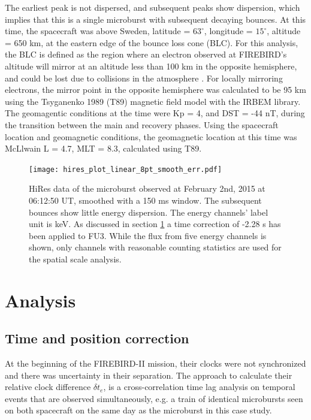 \documentclass[draft,linenumbers]{agujournal}
\begin{document}
The earliest peak is not dispersed, and subsequent peaks show dispersion, which implies that this is a single microburst with subsequent decaying bounces. At this time, the spacecraft was above Sweden, latitude = $63^{\circ}$, longitude = $15^{\circ}$, altitude = 650 km, at the eastern edge of the bounce loss cone (BLC). For this analysis, the BLC is defined as the region where an electron observed at FIREBIRD's altitude will mirror at an altitude less than 100 km in the opposite hemisphere, and could be lost due to collisions in the atmosphere \citep{Abel1998_1}. For locally mirroring electrons, the mirror point in the opposite hemisphere was calculated to be 95 km using the Tsyganenko 1989 (T89) magnetic field model \citep{Tsyganenko89} with the IRBEM library. The geomagentic conditions at the time were Kp = 4, and DST = -44 nT, during the transition between the main and recovery phases. Using the spacecraft location and geomagnetic conditions, the geomagnetic location at this time was McLlwain L = 4.7, MLT = 8.3, calculated using T89. 

\begin{figure}
\texttt{[image: hires\_plot\_linear\_8pt\_smooth\_err.pdf]}
\caption{HiRes data of the microburst observed at February 2nd, 2015 at 06:12:50 UT, smoothed with a 150 ms window. The subsequent bounces show little energy dispersion. The energy channels' label unit is keV. As discussed in section \ref{analysis} a time correction of -2.28 s has been applied to FU3. While the flux from five energy channels is shown, only channels with reasonable counting statistics are used for the spatial scale analysis.}
\label{hires_plot}
\end{figure}

\section{Analysis} \label{analysis} %
\subsection{Time and position correction} \label{corrections}
At the beginning of the FIREBIRD-II mission, their clocks were not synchronized and there was uncertainty in their separation. The approach to calculate their relative clock difference $\delta t_{e}$, is a cross-correlation time lag analysis on temporal events that are observed simultaneously, e.g. a train of identical microbursts seen on both spacecraft on the same day as the microburst in this case study. 
\end{document}
